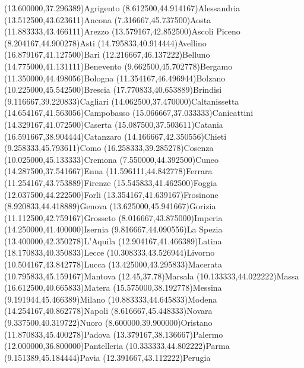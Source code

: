 \mapput[90](13.600000,37.296389){Agrigento}
\mapput[0](8.612500,44.914167){Alessandria}
\mapput[90](13.512500,43.623611){Ancona }
\mapput[90](7.316667,45.737500){Aosta}
\mapput[90](11.883333,43.466111){Arezzo}
\mapput[90](13.579167,42.852500){Ascoli Piceno}
\mapput[90](8.204167,44.900278){Asti}
\mapput[90](14.795833,40.914444){Avellino}
\mapput[90](16.879167,41.127500){Bari}
\mapput[90](12.216667,46.137222){Belluno}
\mapput[90](14.775000,41.131111){Benevento}
\mapput[70](9.662500,45.702778){Bergamo}
\mapput[-90](11.350000,44.498056){Bologna}
\mapput[90](11.354167,46.496944){Bolzano}
\mapput[90](10.225000,45.542500){Brescia}
\mapput[90](17.770833,40.653889){Brindisi}
\mapput[90](9.116667,39.220833){Cagliari}
\mapput[90](14.062500,37.470000){Caltanissetta}
\mapput[90](14.654167,41.563056){Campobasso}
\mapput[-180](15.066667,37.033333){Canicattini}%
\mapput[90](14.329167,41.072500){Caserta}
\mapput[90](15.087500,37.503611){Catania}
\mapput[90](16.591667,38.904444){Catanzaro}
\mapput[90](14.166667,42.350556){Chieti}
\mapput[90](9.258333,45.793611){Como}
\mapput[90](16.258333,39.285278){Cosenza}
\mapput[90](10.025000,45.133333){Cremona}
\mapput[90](7.550000,44.392500){Cuneo}
\mapput[90](14.287500,37.541667){Enna}
\mapput[90](11.596111,44.842778){Ferrara}
\mapput[90](11.254167,43.753889){Firenze}
\mapput[90](15.545833,41.462500){Foggia}
\mapput[90](12.037500,44.222500){Forli}
\mapput[90](13.354167,41.639167){Frosinone}
\mapput[90](8.920833,44.418889){Genova}
\mapput[90](13.625000,45.941667){Gorizia}
\mapput[90](11.112500,42.759167){Grosseto}
\mapput[90](8.016667,43.875000){Imperia}
\mapput[90](14.250000,41.400000){Isernia}
\mapput[90](9.816667,44.090556){La Spezia}
\mapput[90](13.400000,42.350278){L'Aquila}
\mapput[90](12.904167,41.466389){Latina}
\mapput[90](18.170833,40.350833){Lecce}
\mapput[90](10.308333,43.526944){Livorno}
\mapput[90](10.504167,43.842778){Lucca}
\mapput[90](13.425000,43.295833){Macerata}
\mapput[90](10.795833,45.159167){Mantova}
\mapput[0](12.45,37.78){Marsala}
\mapput[90](10.133333,44.022222){Massa}
\mapput[90](16.612500,40.665833){Matera}
\mapput[90](15.575000,38.192778){Messina}
\mapput[90](9.191944,45.466389){Milano}
\mapput[-90](10.883333,44.645833){Modena}
\mapput[90](14.254167,40.862778){Napoli}
\mapput[90](8.616667,45.448333){Novara}
\mapput[90](9.337500,40.319722){Nuoro}
\mapput[90](8.600000,39.900000){Oristano}
\mapput[90](11.870833,45.400278){Padova}
\mapput[90](13.379167,38.136667){Palermo}
\mapput[90](12.000000,36.800000){Pantelleria}
\mapput[90](10.333333,44.802222){Parma}
\mapput[90](9.151389,45.184444){Pavia}
\mapput[90](12.391667,43.112222){Perugia}
